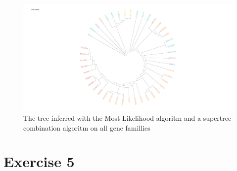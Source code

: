 \documentclass[]{article}
\theoremstyle{definition}
\begin{document}
\begin{figure}[H]
	\includegraphics*[width = \linewidth]{image/ML_supertree.pdf}
	\caption{ The tree inferred with the Most-Likelihood algoritm and a supertree combination algoritm on all gene famillies}
\end{figure}

\section{Exercise 5}
\end{document}

